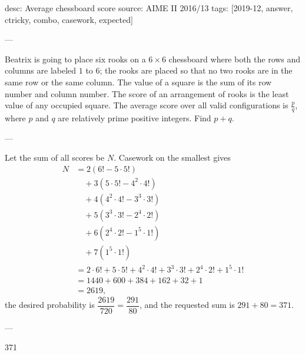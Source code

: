 desc: Average chessboard score
source: AIME II 2016/13
tags: [2019-12, answer, ctricky, combo, casework, expected]

---

Beatrix is going to place six rooks on a $6\times6$ chessboard where both the rows and columns are labeled $1$ to $6$; the rooks are placed so that no two rooks are in the same row or the same column. The value of a square is the sum of its row number and column number. The score of an arrangement of rooks is the least value of any occupied square. The average score over all valid configurations is $\tfrac{p}{q}$, where $p$ and $q$ are relatively prime positive integers. Find $p+q$.

---

Let the sum of all scores be $N$. Casework on the smallest gives
\begin{align*}
    N&=2(6!-5\cdot 5!)\\
    &\quad+3(5\cdot 5!-4^2\cdot 4!)\\
    &\quad+4(4^2\cdot 4!-3^3\cdot 3!)\\
    &\quad+5(3^3\cdot 3!-2^4\cdot 2!)\\
    &\quad+6(2^4\cdot 2!-1^5\cdot 1!)\\
    &\quad+7(1^5\cdot 1!)\\
    &=2\cdot 6!+5\cdot 5!+4^2\cdot 4!+3^3\cdot 3!+2^4\cdot 2!+1^5\cdot 1!\\
    &=1440+600+384+162+32+1\\
    &=2619,
\end{align*}
the desired probability is $\dfrac{2619}{720}=\dfrac{291}{80}$, and the requested sum is $291+80=371$.

---

371
